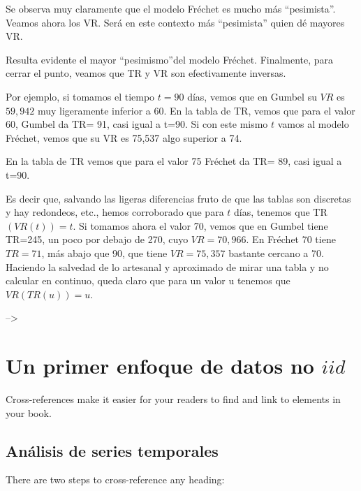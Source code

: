 \documentclass[
]{book}
\theoremstyle{definition}
\theoremstyle{definition}
\theoremstyle{definition}
\theoremstyle{definition}
\theoremstyle{remark}
\begin{document}
Se observa muy claramente que el modelo Fréchet es mucho más ``pesimista''. Veamos ahora los VR. Será en este contexto más ``pesimista'' quien dé mayores VR.

Resulta evidente el mayor ``pesimismo''del modelo Fréchet.
Finalmente, para cerrar el punto, veamos que TR y VR son efectivamente inversas.

Por ejemplo, si tomamos el tiempo \(t=90\) días, vemos que en Gumbel su \(VR\) es \(59,942\) muy ligeramente inferior a 60. En la tabla de TR, vemos que para el valor 60, Gumbel da TR= 91, casi igual a t=90. Si con este mismo \(t\) vamos al modelo Fréchet, vemos que su VR es 75,537 algo superior a 74.

En la tabla de TR vemos que para el valor 75 Fréchet da TR= 89, casi igual a t=90.

Es decir que, salvando las ligeras diferencias fruto de que las tablas son discretas y hay redondeos, etc., hemos corroborado que para \(t\) días, tenemos que TR \((VR(t))=t\).
Si tomamos ahora el valor 70, vemos que en Gumbel tiene TR=245, un poco por debajo de 270, cuyo \(VR=70,966\). En Fréchet 70 tiene \(TR=71\), más abajo que 90, que tiene \(VR= 75,357\) bastante cercano a 70.
Haciendo la salvedad de lo artesanal y aproximado de mirar una tabla y no calcular en continuo, queda claro que para un valor u tenemos que \(VR(TR(u))=u\).

--\textgreater{}

\chapter{\texorpdfstring{Un primer enfoque de datos no \(iid\)}{Un primer enfoque de datos no iid}}\label{cross}

Cross-references make it easier for your readers to find and link to elements in your book.

\section{Análisis de series temporales}\label{anuxe1lisis-de-series-temporales}

There are two steps to cross-reference any heading:
\end{document}
